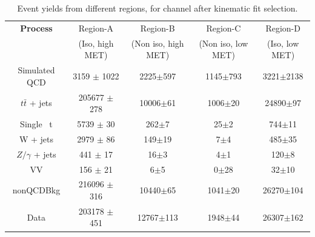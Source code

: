 \begin{table}
\caption{Event yields from different regions, for \mujets channel after kinematic fit selection.}
\label{tab:qcdABCD_mu}
\centering
\begin{adjustbox}{max width=\textwidth}
\begin{tabular}{ccccc}
\hline 
\hline 
\bf{Process} & Region-A & Region-B & Region-C & Region-D  \\ 
 & (Iso, high MET) & (Non iso, high MET) & (Non iso, low MET)& (Iso, low MET) \\ 
\hline 
\hline 
Simulated QCD & 3159 $\pm$ 1022 & 2225$\pm$597 & 1145$\pm$793 & 3221$\pm$2138 \\ 
\hline 
$t\bar{t}$ + jets & 205677 $\pm$ 278 & 10006$\pm$61 & 1006$\pm$20 & 24890$\pm$97 \\ 
Single ~t & 5739 $\pm$ 30 & 262$\pm$7 & 25$\pm$2 & 744$\pm$11 \\ 
 W + jets & 2979 $\pm$ 86 & 149$\pm$19 & 7$\pm$4 & 485$\pm$35 \\ 
$Z/\gamma$ + jets & 441 $\pm$ 17 & 16$\pm$3 & 4$\pm$1 & 120$\pm$8 \\ 
VV & 156 $\pm$ 21 & 6$\pm$5 & 0$\pm$28 & 32$\pm$10 \\ 
\hline 
nonQCDBkg & 216096 $\pm$ 316 & 10440$\pm$65 & 1041$\pm$20 & 26270$\pm$104 \\ 
\hline 
Data & 203178 $\pm$ 451 & 12767$\pm$113 & 1948$\pm$44 & 26307$\pm$162 \\ 
\hline 
\end{tabular}
\end{adjustbox}
\end{table}


